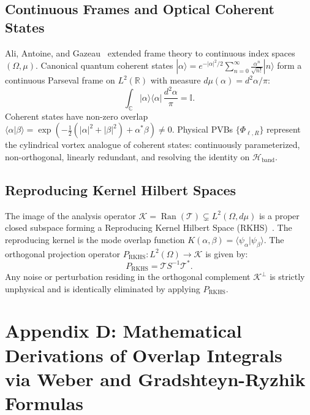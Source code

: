 \documentclass[11pt,a4paper]{article}
\begin{document}
\subsection{Continuous Frames and Optical Coherent States}

Ali, Antoine, and Gazeau~\cite{Ali1993,Gazeau2009,Klauder1985,Perelomov1986} extended frame theory to continuous index spaces $(\Omega, \mu)$. Canonical quantum coherent states $|\alpha\rangle = e^{-|\alpha|^2/2} \sum_{n=0}^\infty \frac{\alpha^n}{\sqrt{n!}} |n\rangle$ form a continuous Parseval frame on $L^2(\mathbb{R})$ with measure $d\mu(\alpha) = d^2\alpha / \pi$:
\begin{equation}
\int_{\mathbb{C}} |\alpha\rangle \langle \alpha| \, \frac{d^2\alpha}{\pi} = \mathbb{I}.
\label{eq:app_coherent_resolution}
\end{equation}
Coherent states have non-zero overlap $\langle \alpha | \beta \rangle = \exp(-\frac{1}{2}(|\alpha|^2 + |\beta|^2) + \alpha^* \beta) \neq 0$. Physical PVBs $\{\Phi_{\ell, R}\}$ represent the cylindrical vortex analogue of coherent states: continuously parameterized, non-orthogonal, linearly redundant, and resolving the identity on $\mathcal{H}_{\text{band}}$.

\subsection{Reproducing Kernel Hilbert Spaces}

The image of the analysis operator $\mathcal{K} = \operatorname{Ran}(\mathcal{T}) \subsetneq L^2(\Omega, d\mu)$ is a proper closed subspace forming a Reproducing Kernel Hilbert Space (RKHS)~\cite{PaulsenRaghupathi2016}. The reproducing kernel is the mode overlap function $K(\alpha, \beta) = \langle \psi_\alpha | \psi_\beta \rangle$. The orthogonal projection operator $P_{\text{RKHS}}: L^2(\Omega) \to \mathcal{K}$ is given by:
\begin{equation}
P_{\text{RKHS}} = \mathcal{T} S^{-1} \mathcal{T}^*.
\label{eq:app_rkhs_proj}
\end{equation}
Any noise or perturbation residing in the orthogonal complement $\mathcal{K}^\perp$ is strictly unphysical and is identically eliminated by applying $P_{\text{RKHS}}$.

\section{Appendix D: Mathematical Derivations of Overlap Integrals via Weber and Gradshteyn-Ryzhik Formulas}
\label{app:derivations}
\end{document}
